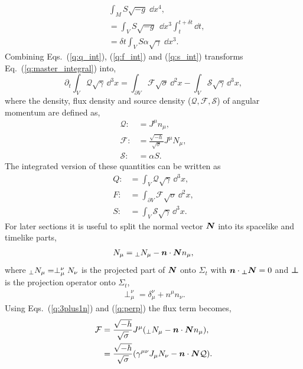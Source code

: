 \begin{align}
&\int_{M} S \sqrt{-g} \;\dd x^4 , \nonumber \\
&=\int_V S \sqrt{-g} \;\,\dd x^3 \int_t^{t+\delta t} \dd t,\\
 \label{q:s_int}&=\delta t \int_V S \alpha\sqrt{\gamma} \;\dd x^3 .
\end{align}
Combining Eqs.~(\ref{q:q_int}), (\ref{q:f_int}) and (\ref{q:s_int}) transforms Eq.~(\ref{q:master_integral}) into,
\begin{equation} \label{q:qfs_system}
\partial_t \int_{V} \mathcal{Q} \sqrt{\gamma} \,\dd^3 x  = \int_{\partial V} \mathcal{F} \sqrt{\sigma} \,\dd^2 x
 - \int_{V} \mathcal{S} \sqrt{\gamma} \,\dd^3 x,
\end{equation}
where the density, flux density and source density ($\mathcal{Q}, \mathcal{F}, \mathcal{S}$) of angular momentum are defined as,
\begin{align}
\label{q:q_def}\mathcal{Q} :&= J^\mu n_\mu , \\
\label{q:flux_def}\mathcal{F} :&= \frac{\sqrt{-h}}{\sqrt{\sigma}}J^\mu N_\mu , \\
\label{q:source_def}\mathcal{S} :&= \alpha S.
\end{align}
The integrated version of these quantities can be written as
\begin{align}
\label{q:eq:Q_def_int}{Q} :&= \int_V \mathcal{Q}\sqrt{\gamma}\,\dd^3 x , \\
\label{q:eq:F_def_int}{F} :&= \int_{\partial V}  \mathcal{F}\sqrt{\sigma}\,\dd^2 x , \\
\label{q:eq:S_def_int}{S} :&= \int_V \mathcal{S}\sqrt{\gamma}\,\dd^3 x.
\end{align}
For later sections it is useful to split the normal vector $\boldsymbol{N}$ into its spacelike and timelike parts,
\begin{align}
\label{q:3plus1n}N_\mu = {}_{\perp}N_\mu - \boldsymbol{n} \cdot \boldsymbol{N} n_\mu,
\end{align}
where ${}_{\perp}N_\mu = \perp^\nu_\mu N_\nu$ is the projected part of $\boldsymbol{N}$ onto $\Sigma_t$ with $\boldsymbol{n}\cdot \boldsymbol{{}_{\perp}N}=0$ and $\boldsymbol{\perp}$ is the projection operator onto $\Sigma_t$,
\begin{align}
\label{q:perp} \perp^\nu_\mu = \delta^\nu_\mu + n^\mu n_\nu.
\end{align}
Using Eqs.~(\ref{q:3plus1n}) and (\ref{q:perp}) the flux term becomes,
\begin{align}
\mathcal{F} &= \frac{\sqrt{-h}}{\sqrt{\sigma}}J^\mu ({}_{\perp}N_\mu - \boldsymbol{n} \cdot \boldsymbol{N} n_\mu), \\
  \label{q:3plus1f} &= \frac{\sqrt{-h}}{\sqrt{\sigma}} (\gamma^{\mu\nu} J_\mu N_\nu - \boldsymbol{n} \cdot \boldsymbol{N} \mathcal{Q}).
\end{align}
